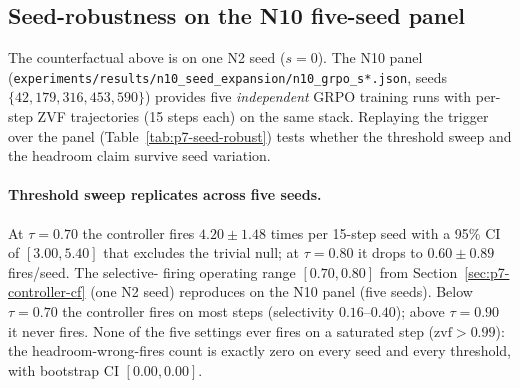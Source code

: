 \subsection{Seed-robustness on the N10 five-seed panel}
\label{sec:p7-controller-seedrobust}
The counterfactual above is on one N2 seed ($s{=}0$). The N10 panel
(\texttt{experiments/results/n10\_seed\_expansion/n10\_grpo\_s*.json},
seeds $\{42, 179, 316, 453, 590\}$) provides five \emph{independent}
GRPO training runs with per-step ZVF trajectories (15 steps each) on
the same stack. Replaying the trigger over the panel
(Table~\ref{tab:p7-seed-robust}) tests whether the threshold sweep and
the headroom claim survive seed variation.

\begin{table}[t]
\centering
\caption{Seed-robust threshold sweep on the N10 panel ($n{=}5$ seeds,
each a 15-step trajectory; bootstrap percentile CIs, $n_{\text{boot}}{=}10{,}000$).
``Wrong fires'' counts trigger events on steps with $\mathrm{zvf} > 0.99$
(i.e.\ on saturated prompts that cannot benefit from escalation).}
\label{tab:p7-seed-robust}
\end{table}

\paragraph{Threshold sweep replicates across five seeds.}
At $\tau{=}0.70$ the controller fires $4.20 \pm 1.48$ times per 15-step
seed with a 95\% CI of $[3.00, 5.40]$ that excludes the trivial null;
at $\tau{=}0.80$ it drops to $0.60 \pm 0.89$ fires/seed. The selective-
firing operating range $[0.70, 0.80]$ from Section~\ref{sec:p7-controller-cf}
(one N2 seed) reproduces on the N10 panel (five seeds). Below $\tau{=}0.70$
the controller fires on most steps (selectivity $0.16$--$0.40$); above
$\tau{=}0.90$ it never fires. None of the five settings ever fires on a
saturated step ($\mathrm{zvf} > 0.99$): the headroom-wrong-fires count is
exactly zero on every seed and every threshold, with bootstrap CI
$[0.00, 0.00]$.

